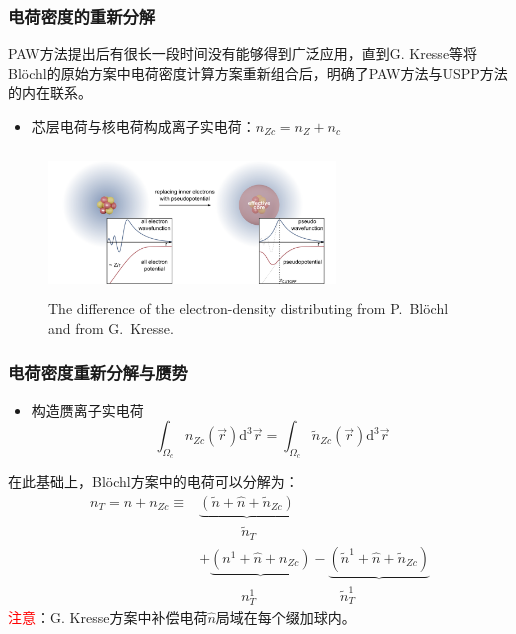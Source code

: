 \documentclass[cjk,slidestop,compress,mathserif,blue]{beamer}
\begin{document}

\frame
{
\frametitle{电荷密度的重新分解}
\textrm{PAW}方法提出后有很长一段时间没有能够得到广泛应用，直到\textrm{G. Kresse}等将\textrm{Bl\"ochl}的原始方案中电荷密度计算方案重新组合后，明确了\textrm{PAW}方法与\textrm{USPP}方法的内在联系。
\begin{itemize}
	\item 芯层电荷与核电荷构成离子实电荷：$n_{Zc}=n_Z+n_c$
\end{itemize}
\begin{figure}[h!]
\centering
\vspace{-10.5pt}
\includegraphics[height=1.5in,width=3.0in,viewport=0 0 380 190,clip]{Figures/Pseudo-potential_charge.png}
\caption{\tiny \textrm{The difference of the electron-density distributing from P.~Bl\"ochl  and from G.~Kresse.}}%
\label{PAW_Pseudo-Charge}
\end{figure}
}

\frame
{
	\frametitle{电荷密度重新分解与赝势}
\begin{itemize}
	\item 构造赝离子实电荷$$\int_{\Omega_c}n_{Zc}(\vec r)\mathrm{d}^3\vec r=\int_{\Omega_c}\tilde n_{Zc}(\vec r)\mathrm{d}^3\vec r$$
\end{itemize}
在此基础上，\textrm{Bl\"ochl}方案中的电荷可以分解为：
\begin{displaymath}
	\begin{aligned}
		n_T=n+n_{Zc}\equiv&\underbrace{(\tilde n+\hat n+\tilde n_{Zc})}\\
				 		&\quad\qquad\tilde n_T\\
				  &+\underbrace{(n^1+\hat n+n_{Zc})}-\underbrace{(\tilde n^1+\hat n+\tilde n_{Zc})}\\
				                  &\quad\qquad n_T^1\qquad\qquad\qquad\tilde n_T^1
	\end{aligned}
\end{displaymath}
\textcolor{red}{注意}：\textrm{G. Kresse}方案中补偿电荷$\hat n$局域在每个缀加球内。
}
\end{document}
